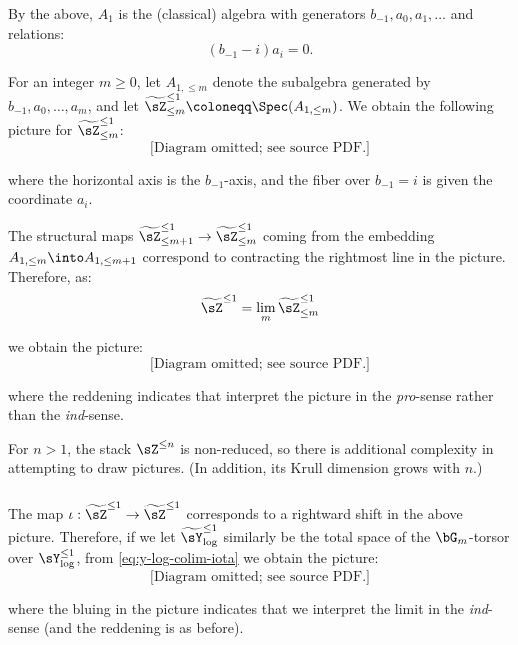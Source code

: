 \subsubsection{}

By the above, $A_1$ is the (classical) algebra with generators
$b_{-1},a_0,a_1,\ldots$ and relations:
%
\[
(b_{-1}-i)a_i = 0.
\]

 For an integer $m \geq 0$, let $A_{1,\leq m}$ denote the
subalgebra generated by $b_{-1},a_0,\ldots,a_m$, and let
$\widetilde{\sZ}_{\leq m}^{\leq 1} \coloneqq \Spec(A_{1,\leq m})$.
We obtain the following picture for $\widetilde{\sZ}_{\leq m}^{\leq 1}$:
%
\[
\text{[Diagram omitted; see source PDF.]}
\]

 where the horizontal axis is the $b_{-1}$-axis, and the fiber
over $b_{-1} = i$ is given the coordinate $a_i$.

The structural maps $\widetilde{\sZ}_{\leq m+1}^{\leq 1} \to
\widetilde{\sZ}_{\leq m}^{\leq 1}$ coming from the
embedding $A_{1,\leq m} \into A_{1,\leq m+1}$ correspond to contracting
the rightmost line in the picture. Therefore, as:
%
\[
\widetilde{\sZ}^{\leq 1} = \underset{m}{\lim} \, \widetilde{\sZ}_{\leq m}^{\leq 1}
\]

 we obtain the picture:
%
\[
\text{[Diagram omitted; see source PDF.]}
\]

 where the reddening indicates that interpret the
picture in the \emph{pro}-sense rather than the \emph{ind}-sense.

\begin{rem}
\notready

For $n > 1$, the stack $\sZ^{\leq n}$ is non-reduced, so there
is additional complexity in attempting to draw pictures.
(In addition, its Krull dimension grows with $n$.)

\end{rem}

\subsubsection{}

The map $\iota:\widetilde{\sZ}^{\leq 1} \to \widetilde{\sZ}^{\leq 1}$
corresponds to a rightward
shift in the above picture. Therefore,
if we let $\widetilde{\sY}_{\log}^{\leq 1}$ similarly be the total space
of the $\bG_m$-torsor over $\sY_{\log}^{\leq 1}$,
from \eqref{eq:y-log-colim-iota} we obtain the picture:
%
\[
\text{[Diagram omitted; see source PDF.]}
\]

 where the bluing in the picture indicates that we interpret
the limit in the \emph{ind}-sense (and the reddening is as before).

